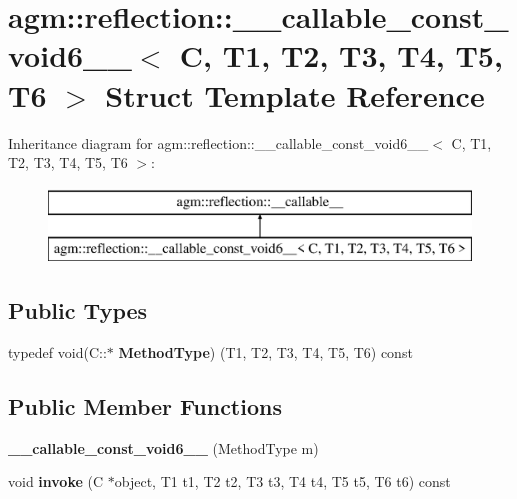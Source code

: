 \hypertarget{structagm_1_1reflection_1_1____callable__const__void6____}{}\section{agm\+:\+:reflection\+:\+:\+\_\+\+\_\+callable\+\_\+const\+\_\+void6\+\_\+\+\_\+$<$ C, T1, T2, T3, T4, T5, T6 $>$ Struct Template Reference}
\label{structagm_1_1reflection_1_1____callable__const__void6____}
Inheritance diagram for agm\+:\+:reflection\+:\+:\+\_\+\+\_\+callable\+\_\+const\+\_\+void6\+\_\+\+\_\+$<$ C, T1, T2, T3, T4, T5, T6 $>$\+:\begin{figure}[H]
\begin{center}
\leavevmode
\includegraphics[height=2.000000cm]{structagm_1_1reflection_1_1____callable__const__void6____}
\end{center}
\end{figure}
\subsection*{Public Types}
\begin{DoxyCompactItemize}
\item 
typedef void(C\+::$\ast$ {\bfseries Method\+Type}) (T1, T2, T3, T4, T5, T6) const \hypertarget{structagm_1_1reflection_1_1____callable__const__void6_____af53c1be7fff6970ad4bb17a6c7ada962}{}\label{structagm_1_1reflection_1_1____callable__const__void6_____af53c1be7fff6970ad4bb17a6c7ada962}

\end{DoxyCompactItemize}
\subsection*{Public Member Functions}
\begin{DoxyCompactItemize}
\item 
{\bfseries \+\_\+\+\_\+callable\+\_\+const\+\_\+void6\+\_\+\+\_\+} (Method\+Type m)\hypertarget{structagm_1_1reflection_1_1____callable__const__void6_____a3fb1e148be7cf3bf85328923c6a71a8a}{}\label{structagm_1_1reflection_1_1____callable__const__void6_____a3fb1e148be7cf3bf85328923c6a71a8a}

\item 
void {\bfseries invoke} (C $\ast$object, T1 t1, T2 t2, T3 t3, T4 t4, T5 t5, T6 t6) const \hypertarget{structagm_1_1reflection_1_1____callable__const__void6_____aa3172c560785a896a36c03ade85010ed}{}\label{structagm_1_1reflection_1_1____callable__const__void6_____aa3172c560785a896a36c03ade85010ed}

\end{DoxyCompactItemize}

